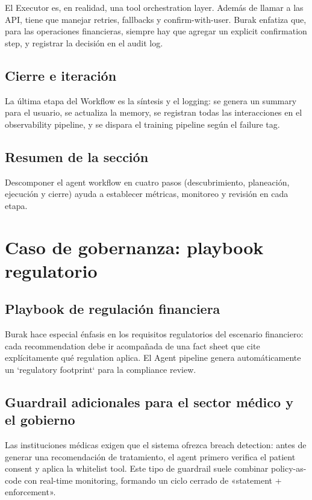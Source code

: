 \documentclass[a4paper]{article}
\begin{document}
El Executor es, en realidad, una tool orchestration layer. Además de llamar a las API, tiene que manejar retries, fallbacks y confirm-with-user. Burak enfatiza que, para las operaciones financieras, siempre hay que agregar un explicit confirmation step, y registrar la decisión en el audit log.

\subsection{Cierre e iteración}

La última etapa del Workflow es la síntesis y el logging: se genera un summary para el usuario, se actualiza la memory, se registran todas las interacciones en el observability pipeline, y se dispara el training pipeline según el failure tag.

\subsection{Resumen de la sección}

Descomponer el agent workflow en cuatro pasos (descubrimiento, planeación, ejecución y cierre) ayuda a establecer métricas, monitoreo y revisión en cada etapa.
\section{Caso de gobernanza: playbook regulatorio}

\subsection{Playbook de regulación financiera}

Burak hace especial énfasis en los requisitos regulatorios del escenario financiero: cada recommendation debe ir acompañada de una fact sheet que cite explícitamente qué regulation aplica. El Agent pipeline genera automáticamente un `regulatory footprint` para la compliance review.

\subsection{Guardrail adicionales para el sector médico y el gobierno}

Las instituciones médicas exigen que el sistema ofrezca breach detection: antes de generar una recomendación de tratamiento, el agent primero verifica el patient consent y aplica la whitelist tool. Este tipo de guardrail suele combinar policy-as-code con real-time monitoring, formando un ciclo cerrado de «statement + enforcement».
\end{document}
